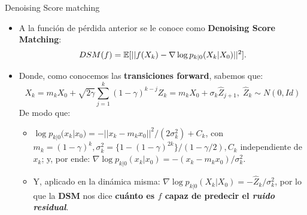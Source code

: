 \documentclass[aspectratio=169,xcolor=dvipsnames, t, spanish]{beamer}
\begin{document}
    \begin{frame}{Denoising Score matching}\vspace{-3mm}
        \begin{itemize}
            \item A la función de pérdida anterior se le conoce como \textbf{Denoising Score Matching}:
            \[ DSM(f) = \mathbb{E}[||f(X_{k})-\nabla \log p_{k|0}(X_{k}|X_{0})||^{2}] . \vspace{-3mm}\]
            
            \pause\item Donde, como conocemos las \textbf{transiciones forward}, sabemos que:
            $$X_{k}=m_{k}X_{0}+\sqrt{2\gamma}\sum_{j=1}^{k}(1-\gamma)^{k-j}Z_{k}=m_{k}X_{0}+\sigma_{k}\hat{Z}_{j+1}, \; \hat{Z}_{k}\sim N(0,Id)$$
            De modo que:
            \begin{itemize}
                \item $\log p_{k|0}(x_{k}|x_{0})=-||x_{k}-m_{k}x_{0}||^{2}/(2\sigma_{k}^{2})+C_{k}$, con $m_{k}=(1-\gamma)^{k}, \sigma_{k}^{2}=\{1-(1-\gamma)^{2k}\}/(1-\gamma/2), C_{k}$ independiente de $x_{k}$; y, por ende: $\nabla \log p_{k|0}(x_{k}|x_{0})=-(x_{k}-m_{k}x_{0})/\sigma_{k}^{2}.$
                \item Y, aplicado en la dinámica misma: $\nabla \log p_{k|0}(X_{k}|X_{0})=-\hat{Z}_{k}/\sigma_{k}^{2}$, por lo que la \textbf{DSM} nos dice \textbf{cuánto es $f$ capaz de predecir el \textit{ruido residual}}.
            \end{itemize}
        \end{itemize}
    \end{frame}
    
\end{document}
